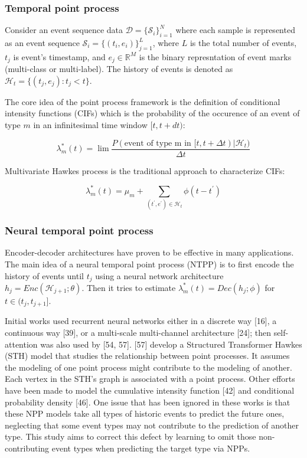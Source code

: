 \documentclass[journal,twoside,web]{ieeecolor}
\begin{document}
\subsubsection*{Temporal point process}


Consider an event sequence data  $\mathcal{D}=\{\mathcal{S}_{i}\}_{i=1}^N$ where each sample is represented as an event sequence  $\mathcal{S}_{i}=\{(t_i,e_i)\}_{j=1}^L$, where $L$ is the total number of events, $t_j$ is event's timestamp, and $e_j \in \mathbb{R}^M $ is the binary represntation of event marks (multi-class or multi-label). The history of events is denoted as $\mathcal{H}_t=\{(t_j,e_j):t_j<t \}$.

The core idea of the point process framework is the definition of conditional intensity functions (CIFs) which is the probability of the occurence of an event of type $m$ in an infinitesimal time window $[t,t+dt)$:

\begin{equation} 
   \lambda_m^{*}(t)=\lim \frac{P(  \text{event of type m in } [t,t+\Delta t) |   \mathcal{H}_t  )}{\Delta t} 
\end{equation} 

Multivariate Hawkes process is the traditional approach to characterize CIFs:

\begin{equation} 
    \lambda_m^{*}(t)= \mu_m + \sum_{(t^{\prime},e^{\prime})\in \mathcal{H}_t} \phi(t-t^{\prime})
 \end{equation} 


\subsubsection*{Neural temporal point process}

Encoder-decoder architectures have proven to be effective in many applications. The main idea of a neural temporal point process (NTPP) is to first encode the history of events until $t_j$ using a neural network architecture $h_j=Enc(\mathcal{H}_{j+1};\theta)$. Then it tries to estimate $\lambda^*_m(t)=Dec(h_j;\phi)$ for $ t \in (t_j,t_{j+1}]$.

Initial works used recurrent neural networks either in a discrete way [16], a continuous way [39], or a multi-scale multi-channel architecture [24]; then self-attention was also used by [54, 57]. [57] develop a Structured Transformer Hawkes (STH) model that studies the relationship between point processes. It assumes the modeling of one point process might contribute to the modeling of another. Each vertex in the STH’s graph is associated with a point process. Other efforts have been made to model the cumulative intensity function [42] and conditional probability density [46]. One issue that has been ignored in these works is that these NPP models take all types of historic events to predict the future ones, neglecting that some event types may not contribute to the prediction of another type. This study aims to correct this defect by learning to omit those non-contributing event types when predicting the target type via NPPs.
\end{document}
